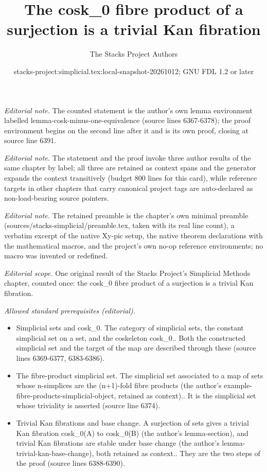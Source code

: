 \documentclass{stacks-project}
\title{The cosk\_0 fibre product of a surjection is a trivial Kan fibration}
\author{The Stacks Project Authors}
\date{stacks-project:simplicial.tex:local-snapshot-20261012; GNU FDL 1.2 or later}
\theoremstyle{plain}
\theoremstyle{definition}
\theoremstyle{remark}
\numberwithin{equation}{subsection}
\begin{document}
\maketitle
\noindent\textit{Editorial note.} The counted statement is the author's own lemma environment labelled lemma-cosk-minus-one-equivalence (source lines 6367-6378); the proof environment begins on the second line after it and is its own proof, closing at source line 6391.\par\medskip
\noindent\textit{Editorial note.} The statement and the proof invoke three author results of the same chapter by label; all three are retained as context spans and the generator expands the context transitively (budget 800 lines for this card), while reference targets in other chapters that carry canonical project tags are auto-declared as non-load-bearing source pointers.\par\medskip
\noindent\textit{Editorial note.} The retained preamble is the chapter's own minimal preamble (sources/stacks-simplicial/preamble.tex, taken with its real line count), a verbatim excerpt of the native Xy-pic setup, the native theorem declarations with the mathematical macros, and the project's own no-op reference environments; no macro was invented or redefined.\par\medskip
\noindent\textit{Editorial scope.} One original result of the Stacks Project's Simplicial Methods chapter, counted once: the cosk\_0 fibre product of a surjection is a trivial Kan fibration.\par\medskip
\noindent\textit{Allowed standard prerequisites (editorial).}\begin{itemize}
\item Simplicial sets and cosk\_0. The category of simplicial sets, the constant simplicial set on a set, and the coskeleton cosk\_0.. Both the constructed simplicial set and the target of the map are described through these (source lines 6369-6377, 6383-6386).
\item The fibre-product simplicial set. The simplicial set associated to a map of sets whose n-simplices are the (n+1)-fold fibre products (the author's example-fibre-products-simplicial-object, retained as context).. It is the simplicial set whose triviality is asserted (source line 6374).
\item Trivial Kan fibrations and base change. A surjection of sets gives a trivial Kan fibration cosk\_0(A) to cosk\_0(B) (the author's lemma-section), and trivial Kan fibrations are stable under base change (the author's lemma-trivial-kan-base-change), both retained as context.. They are the two steps of the proof (source lines 6388-6390).
\end{itemize}\medskip
\end{document}
